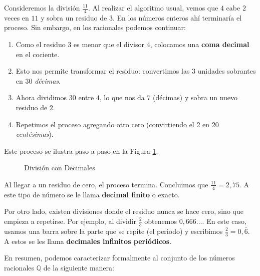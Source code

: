 \begin{enumerate}
Consideremos la división $\frac{11}{4}$. Al realizar el algoritmo usual, vemos que $4$ cabe $2$ veces en $11$ y sobra un residuo de $3$. En los números enteros ahí terminaría el proceso. Sin embargo, en los racionales podemos continuar:

\begin{enumerate}
    \item Como el residuo $3$ es menor que el divisor $4$, colocamos una \textbf{coma decimal} en el cociente.
    \item Esto nos permite transformar el residuo: convertimos las 3 unidades sobrantes en 30 \textit{décimas}.
    \item Ahora dividimos $30$ entre $4$, lo que nos da $7$ (décimas) y sobra un nuevo residuo de $2$.
    \item Repetimos el proceso agregando otro cero (convirtiendo el 2 en 20 \textit{centésimas}).
\end{enumerate}

Este proceso se ilustra paso a paso en la Figura \ref{fig:divisiondecimal03}.

  \begin{figure}[ht]
\begin{center}
\caption{División con Decimales}\label{fig:divisiondecimal03}
\end{center}  
 \end{figure}
Al llegar a un residuo de cero, el proceso termina. Concluimos que $\frac{11}{4} = 2,75$. A este tipo de número se le llama \textbf{decimal finito} o exacto.

Por otro lado, existen divisiones donde el residuo nunca se hace cero, sino que empieza a repetirse. Por ejemplo, al dividir $\frac{2}{3}$ obtenemos $0,666\dots$. En este caso, usamos una barra sobre la parte que se repite (el periodo) y escribimos $\frac{2}{3}=0,\overline{6}$. A estos se les llama \textbf{decimales infinitos periódicos}.

En resumen, podemos caracterizar formalmente al conjunto de los números racionales $\mathbb{Q}$ de la siguiente manera:


\end{enumerate}
